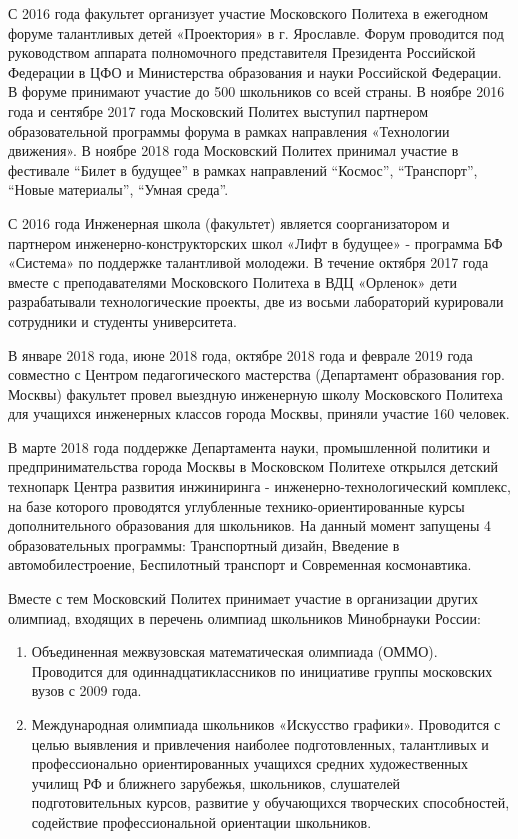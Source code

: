 С 2016 года факультет организует участие Московского Политеха в ежегодном форуме талантливых детей «Проектория» в г. Ярославле. Форум проводится под руководством аппарата полномочного представителя Президента Российской Федерации в ЦФО и Министерства образования и науки Российской Федерации. В форуме принимают участие до 500 школьников со всей страны. В ноябре 2016 года и сентябре 2017 года Московский Политех выступил партнером образовательной программы форума в рамках направления «Технологии движения». В ноябре 2018 года Московский Политех принимал участие в фестивале “Билет в будущее” в рамках направлений “Космос”, “Транспорт”, “Новые материалы”, “Умная среда”.

С 2016 года Инженерная школа (факультет) является соорганизатором и партнером инженерно-конструкторских школ «Лифт в будущее» - программа БФ «Система» по поддержке талантливой молодежи. В течение октября 2017 года вместе с преподавателями Московского Политеха в ВДЦ «Орленок» дети разрабатывали технологические проекты, две из восьми лабораторий курировали сотрудники и студенты университета.

В январе 2018 года, июне 2018 года, октябре 2018 года и феврале 2019 года совместно с Центром педагогического мастерства (Департамент образования гор. Москвы) факультет провел выездную инженерную школу Московского Политеха для учащихся инженерных классов города Москвы, приняли участие 160 человек.

В марте 2018 года поддержке Департамента науки, промышленной политики и предпринимательства города Москвы в Московском Политехе открылся детский технопарк Центра развития инжиниринга - инженерно-технологический комплекс, на базе которого проводятся углубленные технико-ориентированные курсы дополнительного образования для школьников. На данный момент запущены 4 образовательных программы: Транспортный дизайн, Введение в автомобилестроение, Беспилотный транспорт и Современная космонавтика.

Вместе с тем Московский Политех принимает участие в организации других олимпиад, входящих в перечень олимпиад школьников Минобрнауки России:
\begin{enumerate}
    \item Объединенная межвузовская математическая олимпиада (ОММО). Проводится для одиннадцатиклассников по инициативе группы московских вузов с 2009 года.
    \item Международная олимпиада школьников «Искусство графики». Проводится с целью выявления и привлечения наиболее подготовленных, талантливых и профессионально ориентированных учащихся средних художественных училищ РФ и ближнего зарубежья, школьников, слушателей подготовительных курсов, развитие у обучающихся творческих способностей, содействие профессиональной ориентации школьников.
\end{enumerate}

